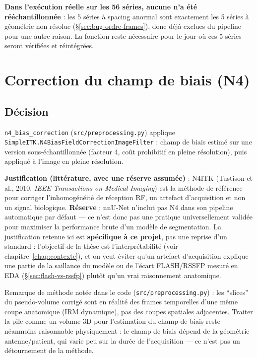 \textbf{Dans l'exécution réelle sur les 56 séries, aucune n'a été rééchantillonnée} : les
5 séries à spacing anormal sont exactement les 5 séries à géométrie non résolue
(\S\ref{sec:bug-ordre-frames}), donc déjà exclues du pipeline pour une autre raison. La
fonction reste nécessaire pour le jour où ces 5 séries seront vérifiées et
réintégrées.

\section{Correction du champ de biais (N4)}

\subsection{Décision}

\texttt{n4\_bias\_correction} (\texttt{src/preprocessing.py}) applique
\texttt{SimpleITK.N4BiasFieldCorrectionImageFilter} : champ de biais estimé sur une
version sous-échantillonnée (facteur 4, coût prohibitif en pleine résolution), puis
appliqué à l'image en pleine résolution.

\textbf{Justification (littérature, avec une réserve assumée)} : N4ITK (Tustison et
al., 2010, \emph{IEEE Transactions on Medical Imaging}) est la méthode de référence pour
corriger l'inhomogénéité de réception RF, un artefact d'acquisition et non un signal
biologique. \textbf{Réserve} : nnU-Net n'inclut pas N4 dans son pipeline automatique par
défaut --- ce n'est donc pas une pratique universellement validée pour maximiser la
performance brute d'un modèle de segmentation. La justification retenue ici est
\textbf{spécifique à ce projet}, pas une reprise d'un standard : l'objectif de la thèse
est l'interprétabilité (voir chapitre~\ref{chap:contexte}), et on veut éviter qu'un
artefact d'acquisition explique une partie de la saillance du modèle ou de l'écart
FLASH/RSSFP mesuré en EDA (\S\ref{sec:flash-vs-rssfp}) plutôt qu'un vrai raisonnement
anatomique.

Remarque de méthode notée dans le code (\texttt{src/preprocessing.py}) : les
``slices'' du pseudo-volume corrigé sont en réalité des frames temporelles d'une même
coupe anatomique (IRM dynamique), pas des coupes spatiales adjacentes. Traiter la pile
comme un volume 3D pour l'estimation du champ de biais reste néanmoins raisonnable
physiquement : le champ de biais dépend de la géométrie antenne/patient, qui varie peu
sur la durée de l'acquisition --- ce n'est pas un détournement de la méthode.

